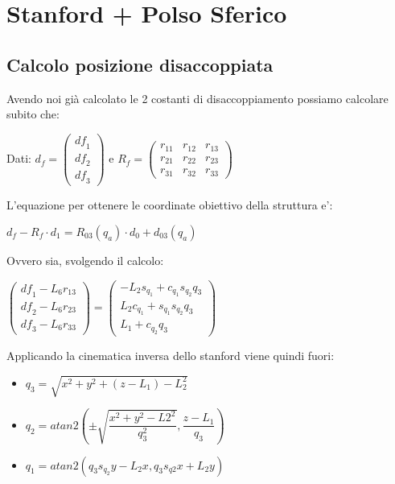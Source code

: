 \documentclass[a4paper,12pt]{article}
\begin{document}
\section{Stanford + Polso Sferico}
\subsection{Calcolo posizione disaccoppiata}

Avendo noi già calcolato le 2 costanti di disaccoppiamento possiamo calcolare subito che:

Dati: $d_f=\begin{pmatrix}{{\mathit{df}}_1}\\
{{\mathit{df}}_2}\\
{{\mathit{df}}_3}\end{pmatrix}$ e $R_f=\begin{pmatrix}{r_{11}} & {r_{12}} & {r_{13}}\\
{r_{21}} & {r_{22}} & {r_{23}}\\
{r_{31}} & {r_{32}} & {r_{33}}\end{pmatrix}$


L'equazione per ottenere le coordinate obiettivo della struttura e':
\begin{center}
$d_f- R_f \cdot d_1 = R_{03}(q_a) \cdot d_0 + d_{03}(q_a)$ 

Ovvero sia, svolgendo il calcolo:

$\begin{pmatrix}{{\mathit{df}}_1}-{L_6} {r_{13}}\\
{{\mathit{df}}_2}-{L_6} {r_{23}}\\
{{\mathit{df}}_3}-{L_6} {r_{33}}\end{pmatrix}=\begin{pmatrix}-{L_2} {s_{{q_1}}}+{c_{{q_1}}} {s_{{q_2}}} {q_3}\\
{L_2} {c_{{q_1}}}+{s_{{q_1}}} {s_{{q_2}}} {q_3}\\
{L_1}+{c_{{q_2}}} {q_3}\end{pmatrix}$
\end{center}

Applicando la cinematica inversa dello stanford viene quindi fuori:
\begin{itemize}
\item $q_3 = \sqrt{x^2 +y^2+(z-L_1)-L_2^2}$
\item $q_2 = atan2(\pm\sqrt{\dfrac{x^2+y^2-L2^2}{q_3^2}},\dfrac{z-L_1}{q_3})$
\item $q_1 = atan2(q_3 s_{q_2}y-L_2x,q_3s_{q2}x+L_2y)$
\end{itemize}
\end{document}
